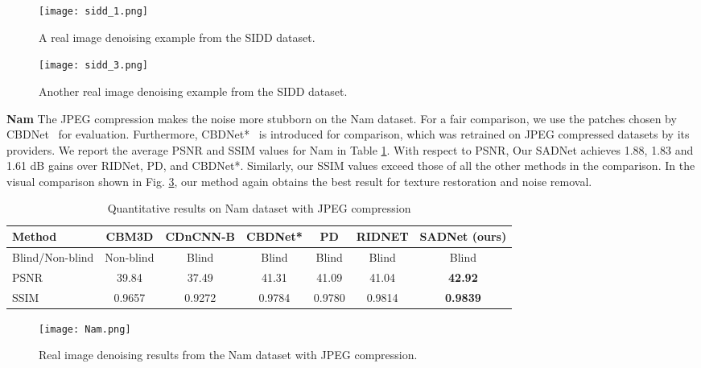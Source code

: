 \documentclass[runningheads]{llncs}
\begin{document}
\begin{figure}
\begin{center}
\texttt{[image: sidd\_1.png]}
\end{center}
\setlength{\abovecaptionskip}{0.cm}
   \caption{A real image denoising example from the SIDD dataset.}
\label{fig_sidd_1}
\end{figure}

\begin{figure}
\begin{center}
\texttt{[image: sidd\_3.png]}
\end{center}
\setlength{\abovecaptionskip}{0.cm}
   \caption{Another real image denoising example from the SIDD dataset.}
\label{fig_sidd_2}
\end{figure}

\textbf{Nam}
The JPEG compression makes the noise more stubborn on the Nam dataset. For a fair comparison, we use the patches chosen by CBDNet~\cite{guo2019toward} for evaluation. Furthermore, CBDNet*~\cite{guo2019toward} is introduced for comparison, which was retrained on JPEG compressed datasets by its providers. We report the average PSNR and SSIM values for Nam in Table \ref{table_Nam}. With respect to PSNR, Our SADNet achieves 1.88, 1.83 and 1.61 dB gains over RIDNet, PD, and CBDNet*. Similarly, our SSIM values exceed those of all the other methods in the comparison. In the visual comparison shown in Fig. \ref{fig_nam}, our method again obtains the best result for texture restoration and noise removal.

\begin{table}
\setlength{\tabcolsep}{2pt}
\begin{center}
\caption{Quantitative results on Nam dataset with JPEG compression}
\label{table_Nam}
\begin{tabular}{lcccccc}
\hline
Method & CBM3D & CDnCNN-B & CBDNet* & PD & RIDNET & SADNet (ours)\\
\hline\hline
Blind/Non-blind & Non-blind & Blind & Blind & Blind & Blind & Blind \\
PSNR & 39.84 & 37.49 & 41.31 & 41.09 & 41.04 & \textbf{42.92}\\
SSIM & 0.9657 & 0.9272 & 0.9784 & 0.9780 & 0.9814 & \textbf{0.9839} \\
\hline
\end{tabular}
\end{center}
\end{table}


\begin{figure}
\begin{center}
\texttt{[image: Nam.png]}
\end{center}
\setlength{\abovecaptionskip}{0.cm}
   \caption{Real image denoising results from the Nam dataset with JPEG compression.}
\label{fig_nam}
\end{figure}
\end{document}
